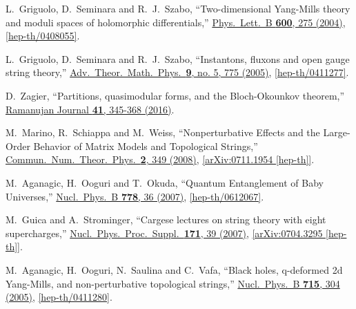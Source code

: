 \documentclass[11pt]{article}
\renewcommand{\[}{\begin{eqnarray}}
\renewcommand{\]}{\end{eqnarray}}
\begin{document}
\begin{thebibliography}{99}
  L.~Griguolo, D.~Seminara and R.~J.~Szabo,
  ``Two-dimensional Yang-Mills theory and moduli spaces of holomorphic differentials,''
  \href{http://dx.doi.org/10.1016/j.physletb.2004.09.010}{Phys.\ Lett.\ B {\bf 600}, 275 (2004)},
 \href{http://arxiv.org/abs/hep-th/0408055}{[hep-th/0408055]}.

  L.~Griguolo, D.~Seminara and R.~J.~Szabo,
  ``Instantons, fluxons and open gauge string theory,''
 \href{http://dx.doi.org/10.4310/ATMP.2005.v9.n5.a5}{Adv.\ Theor.\ Math.\ Phys.\  {\bf 9}, no. 5, 775 (2005)},
 \href{http://arxiv.org/abs/hep-th/0411277}{[hep-th/0411277]}.

D.~Zagier, 
``Partitions, quasimodular forms, and the Bloch-Okounkov theorem,''
\href{http://dx.doi.org/10.1007/s11139-015-9730-8}{Ramanujan Journal {\bf 41}, 345-368 (2016)}.


  M.~Marino, R.~Schiappa and M.~Weiss,
  ``Nonperturbative Effects and the Large-Order Behavior of Matrix Models and Topological Strings,''
  \href{http://dx.doi.org/10.4310/CNTP.2008.v2.n2.a3}{Commun.\ Num.\ Theor.\ Phys.\  {\bf 2}, 349 (2008)},
  \href{http://arxiv.org/abs/0711.1954}{[arXiv:0711.1954 [hep-th]]}.

  M.~Aganagic, H.~Ooguri and T.~Okuda,
  ``Quantum Entanglement of Baby Universes,''
 \href{http://dx.doi.org/10.1016/j.nuclphysb.2007.04.006}{Nucl.\ Phys.\ B {\bf 778}, 36 (2007)},
\href{http://arxiv.org/abs/hep-th/0612067}{[hep-th/0612067]}.

  M.~Guica and A.~Strominger,
  ``Cargese lectures on string theory with eight supercharges,''
  \href{http://dx.doi.org/10.1016/j.nuclphysbps.2007.06.007}{Nucl.\ Phys.\ Proc.\ Suppl.\  {\bf 171}, 39 (2007)},
  \href{http://arxiv.org/abs/0704.3295}{[arXiv:0704.3295 [hep-th]]}.

  M.~Aganagic, H.~Ooguri, N.~Saulina and C.~Vafa,
  ``Black holes, q-deformed 2d Yang-Mills, and non-perturbative topological strings,''
  \href{http://dx.doi.org/10.1016/j.nuclphysb.2005.02.035}{Nucl.\ Phys.\ B {\bf 715}, 304 (2005)},
 \href{http://arxiv.org/abs/hep-th/0411280}{[hep-th/0411280]}.


\end{thebibliography}
\end{document}
